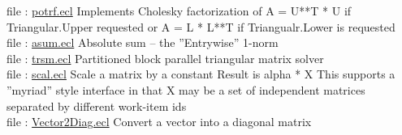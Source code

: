 file : \hyperlink{PBblas.potrf}{potrf.ecl}  Implements Cholesky factorization of A = U**T * U if Triangular.Upper requested or A = L * L**T if Triangualr.Lower is requested \\
file : \hyperlink{PBblas.asum}{asum.ecl}  Absolute sum -- the ''Entrywise'' 1-norm \\
file : \hyperlink{PBblas.trsm}{trsm.ecl}  Partitioned block parallel triangular matrix solver \\
file : \hyperlink{PBblas.scal}{scal.ecl}  Scale a matrix by a constant Result is alpha * X This supports a ''myriad'' style interface in that X may be a set of independent matrices separated by different work-item ids \\
file : \hyperlink{PBblas.Vector2Diag}{Vector2Diag.ecl}  Convert a vector into a diagonal matrix \\


















